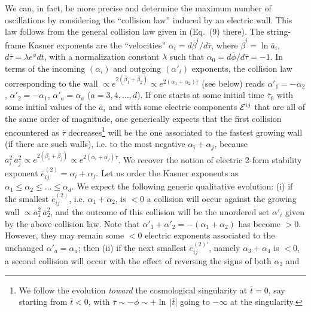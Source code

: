\documentclass[a4paper,12pt]{article}
\begin{document}
We can, in fact, be 
more precise and determine the maximum number of oscillations by 
considering the ``collision law'' induced by an electric wall. This law 
follows from the general collision law given in \cite{dh1} (Eq.~(9) 
there). The  string-frame Kasner exponents are the ``velocities''
$\alpha_i = d \overline \beta^i/ d \overline \tau$, where 
$\overline \beta^i = \ln \overline a_i$, $d \overline \tau = \lambda
e^{\overline \phi} d \overline t$, with a normalization constant
$\lambda$ such that $ \alpha_0 = d \overline \phi/ d \overline \tau =-1$.
In terms of the incoming $(\alpha_i)$ and outgoing $(\alpha'_i)$ 
 exponents, the collision law corresponding to the wall
 $\propto e^{2(\overline \beta_1 
+ \overline \beta_2)} \propto e^{2(\alpha_1 + \alpha_2) \overline \tau}$
(see below) reads
$\alpha'_1 = - \alpha_2$,  $\alpha'_2 = - \alpha_1$, $\alpha'_a = 
\alpha_a$ ($a = 3,4,\ldots ,d$). 
If one starts at some initial time 
$\overline \tau_0$ with some initial values of the $\overline a_i$ and 
with some electric components ${\cal E}^{ij}$ that are all of the same 
order of magnitude, one generically expects that the first collision 
encountered as $\overline \tau$ decreases\footnote{We follow the 
evolution {\it toward} the cosmological singularity at $\overline t=0$, 
say starting from $\overline t < 0$, with $\overline \tau \sim - \overline 
\phi \sim + \ln \, \vert \overline t \vert$ going to $-\infty$ at the 
singularity.} will be the one associated to the fastest growing wall (if 
there are such walls), i.e. to the most negative $\alpha_i + \alpha_j$, 
because $\overline a_i^2 \, \overline a_j^2 \propto e^{2(\overline \beta_i 
+ \overline \beta_j)} \propto e^{2(\alpha_i + \alpha_j) \overline \tau}$.
We recover the notion of electric 2-form stability exponent $\overline 
e_{ij}^{(2)} = \alpha_i + \alpha_j$. Let us order the Kasner exponents 
as $\alpha_1 \leq \alpha_2 \leq \ldots \leq \alpha_d$. We expect the 
following generic qualitative evolution: (i) if the smallest $\overline 
e_{ij}^{(2)}$, i.e. $\alpha_1 + \alpha_2$, is $<0$ a collision will 
occur against the growing wall $\propto \overline a_1^2 \, \overline 
a_2^2$, and the outcome of this collision will be the unordered set 
$\alpha'_i$ given by the above collision law. 
Note that $\alpha'_1 + \alpha'_2 = 
-(\alpha_1 + \alpha_2)$ has become $>0$. However, they may remain some 
$<0$ electric exponents associated to the unchanged 
$\alpha'_a = \alpha_a$; then (ii) if the next smallest $\overline 
e_{ij}^{(2)'}$, namely $\alpha_3 + \alpha_4$ is $<0$, a second collision 
will occur with the effect of reversing the signs of both $\alpha_3$ and 
\end{document}
